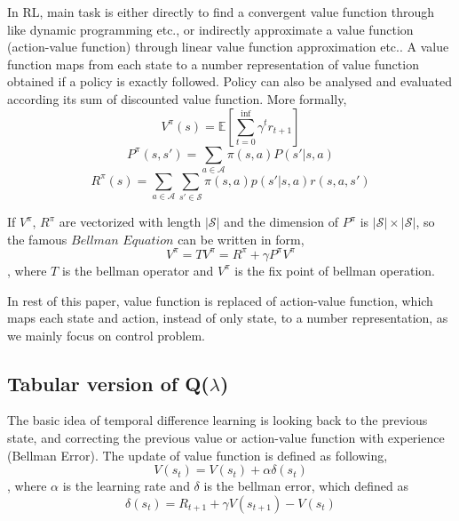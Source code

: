 \documentclass[conference]{IEEEtran}
\begin{document}
In RL, main task is either directly to find a convergent value function through like dynamic programming etc., or indirectly approximate a value function (action-value function) through linear value function approximation etc.. A value function maps from each state to a number representation of value function obtained if a policy is exactly followed. Policy can also be analysed and evaluated according its sum of discounted value function. More formally, 
\begin{equation}
V^{\pi}(s) = \mathbb{E}[\sum_{t=0}^{\inf}\gamma^{t}r_{t+1}]
\end{equation}
\begin{equation}
P^{\pi}(s, s') = \sum_{a\in\mathcal{A}}\pi(s, a)P(s'|s,a)
\end{equation}
\begin{equation}
R^{\pi}(s) = \sum_{a\in\mathcal{A}}\sum_{s'\in\mathcal{S}}\pi(s, a)p(s'|s, a)r(s, a, s')
\end{equation}

If $V^{\pi}$, $R^{\pi}$ are vectorized with length $|\mathcal{S}|$ and the dimension of $P^\pi$ is $|\mathcal{S}|\times|\mathcal{S}|$, so the famous $Bellman$ $Equation$ can be written in form,
\begin{equation}
V^\pi=TV^\pi=R^\pi + \gamma P^\pi V^\pi
\end{equation}
, where $T$ is the bellman operator and $V^\pi$ is the fix point of bellman operation.

In rest of this paper, value function is replaced of action-value function, which maps each state and action, instead of only state, to a number representation, as we mainly focus on control problem.

\subsection{Tabular version of Q($\lambda$)}
The basic idea of temporal difference learning is looking back to the previous state, and correcting the previous value or action-value function with experience (Bellman Error). The update of value function is defined as following,
\begin{equation}
  V(s_t) = V(s_t) + \alpha \delta(s_t)
\end{equation}
, where $\alpha$ is the learning rate and $\delta$ is the bellman error, which defined as
\begin{equation}
  \delta(s_t) = R_{t+1} + \gamma V(s_{t+1}) - V(s_t)
\end{equation}
\end{document}
